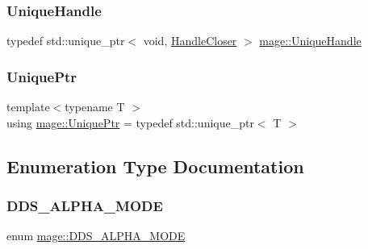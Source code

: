 \subsubsection{\texorpdfstring{Unique\+Handle}{UniqueHandle}}
{\footnotesize\ttfamily typedef std\+::unique\+\_\+ptr$<$ void, \hyperlink{structmage_1_1_handle_closer}{Handle\+Closer} $>$ \hyperlink{namespacemage_a284e84e551a05d4fc6c957985b2de3ed}{mage\+::\+Unique\+Handle}}

\hypertarget{namespacemage_a8c307fbcc33bce9b7f2aa4c26c3b95cf}{}\label{namespacemage_a8c307fbcc33bce9b7f2aa4c26c3b95cf} 
\subsubsection{\texorpdfstring{Unique\+Ptr}{UniquePtr}}
{\footnotesize\ttfamily template$<$typename T $>$ \\
using \hyperlink{namespacemage_a8c307fbcc33bce9b7f2aa4c26c3b95cf}{mage\+::\+Unique\+Ptr} = typedef std\+::unique\+\_\+ptr$<$ T $>$}



\subsection{Enumeration Type Documentation}
\hypertarget{namespacemage_a0c586a2bad862f4858900ca121ca80c2}{}\label{namespacemage_a0c586a2bad862f4858900ca121ca80c2} 
\subsubsection{\texorpdfstring{D\+D\+S\+\_\+\+A\+L\+P\+H\+A\+\_\+\+M\+O\+DE}{DDS\_ALPHA\_MODE}}
{\footnotesize\ttfamily enum \hyperlink{namespacemage_a0c586a2bad862f4858900ca121ca80c2}{mage\+::\+D\+D\+S\+\_\+\+A\+L\+P\+H\+A\+\_\+\+M\+O\+DE}}

